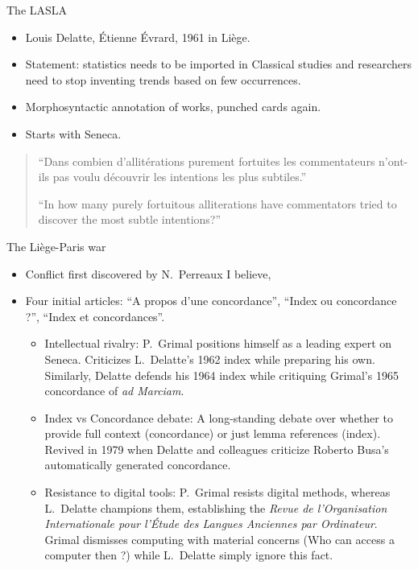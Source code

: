 \documentclass[aspectratio=169]{beamer}
\begin{document}
\begin{frame}{The LASLA}
    \begin{itemize}
        \item Louis Delatte, Étienne Évrard, 1961 in Liège.
        \item Statement: statistics needs to be imported in Classical studies and researchers need to stop inventing trends based on few occurrences.
        \item Morphosyntactic annotation of works, punched cards again.
        \item Starts with Seneca.
    \end{itemize}
    \begin{quote}
        ``Dans combien d'allitérations purement fortuites les commentateurs n'ont-ils pas voulu découvrir les intentions les plus subtiles.''

        ``In how many purely fortuitous alliterations have commentators tried to discover the most subtle intentions?''
    \end{quote}
\end{frame}

\begin{frame}{The Liège-Paris war}
    \begin{itemize}
        \item Conflict first discovered by N.~Perreaux I believe, 
        \item Four initial articles: ``A propos d'une concordance'', ``Index ou concordance ?'', ``Index et concordances''.
        \begin{itemize}
            \item Intellectual rivalry: P.~Grimal positions himself as a leading expert on Seneca. Criticizes L.~Delatte's 1962 index while preparing his own. Similarly, Delatte defends his 1964 index while critiquing Grimal's 1965 concordance of \textit{ad Marciam}.
            \item Index vs Concordance debate: A long-standing debate over whether to provide full context (concordance) or just lemma references (index). Revived in 1979 when Delatte and colleagues criticize Roberto Busa's automatically generated concordance.
            \item Resistance to digital tools: P.~Grimal resists digital methods, whereas L.~Delatte champions them, establishing the \textit{Revue de l'Organisation Internationale pour l'Étude des Langues Anciennes par Ordinateur}. Grimal dismisses computing with material concerns (Who can access a computer then ?) while L.~Delatte simply ignore this fact.
        \end{itemize}
    \end{itemize}
\end{frame}
\end{document}
